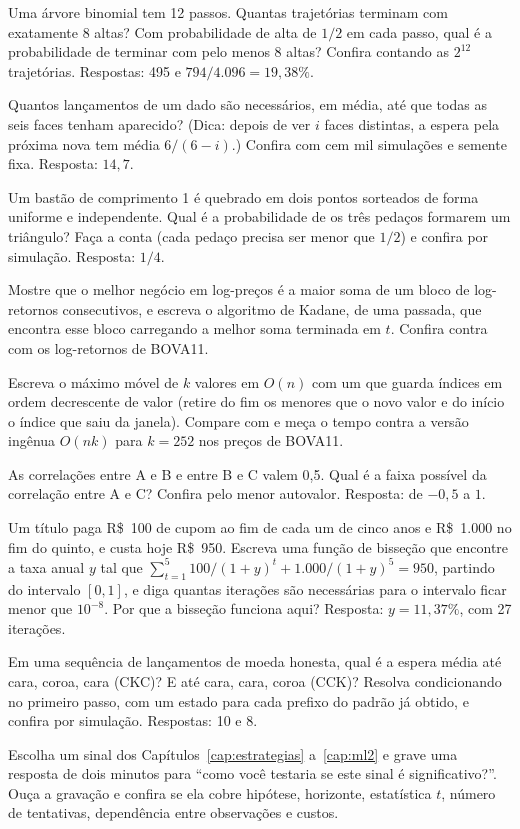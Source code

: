 \begin{exercicios}
  \item {} Uma árvore binomial tem 12 passos. Quantas trajetórias terminam com exatamente 8 altas? Com probabilidade de alta de $1/2$ em cada passo, qual é a probabilidade de terminar com pelo menos 8 altas? Confira contando as $2^{12}$ trajetórias. Respostas: 495 e $794/4.096 = 19,38\%$.
  \item {} Quantos lançamentos de um dado são necessários, em média, até que todas as seis faces tenham aparecido? (Dica: depois de ver $i$ faces distintas, a espera pela próxima nova tem média $6/(6-i)$.) Confira com cem mil simulações e semente fixa. Resposta: $14,7$.
  \item {} Um bastão de comprimento 1 é quebrado em dois pontos sorteados de forma uniforme e independente. Qual é a probabilidade de os três pedaços formarem um triângulo? Faça a conta (cada pedaço precisa ser menor que $1/2$) e confira por simulação. Resposta: $1/4$.
  \item {} Mostre que o melhor negócio em log-preços é a maior soma de um bloco de log-retornos consecutivos, e escreva o algoritmo de Kadane, de uma passada, que encontra esse bloco carregando a melhor soma terminada em $t$. Confira contra  com os log-retornos de BOVA11.
  \item {} Escreva o máximo móvel de $k$ valores em $O(n)$ com um  que guarda índices em ordem decrescente de valor (retire do fim os menores que o novo valor e do início o índice que saiu da janela). Compare com  e meça o tempo contra a versão ingênua $O(nk)$ para $k = 252$ nos preços de BOVA11.
  \item {} As correlações entre A e B e entre B e C valem 0,5. Qual é a faixa possível da correlação entre A e C? Confira pelo menor autovalor. Resposta: de $-0,5$ a $1$.
  \item\label{ex:c16-taxa}  Um título paga R\$~100 de cupom ao fim de cada um de cinco anos e R\$~1.000 no fim do quinto, e custa hoje R\$~950. Escreva uma função de bisseção que encontre a taxa anual $y$ tal que $\sum_{t=1}^{5} 100/(1+y)^t + 1.000/(1+y)^5 = 950$, partindo do intervalo $[0, 1]$, e diga quantas iterações são necessárias para o intervalo ficar menor que $10^{-8}$. Por que a bisseção funciona aqui? Resposta: $y = 11,37\%$, com 27 iterações.
  \item {} Em uma sequência de lançamentos de moeda honesta, qual é a espera média até cara, coroa, cara (CKC)? E até cara, cara, coroa (CCK)? Resolva condicionando no primeiro passo, com um estado para cada prefixo do padrão já obtido, e confira por simulação. Respostas: 10 e 8.
  \item {} Escolha um sinal dos Capítulos~\ref{cap:estrategias} a~\ref{cap:ml2} e grave uma resposta de dois minutos para ``como você testaria se este sinal é significativo?''. Ouça a gravação e confira se ela cobre hipótese, horizonte, estatística $t$, número de tentativas, dependência entre observações e custos.
\end{exercicios}

